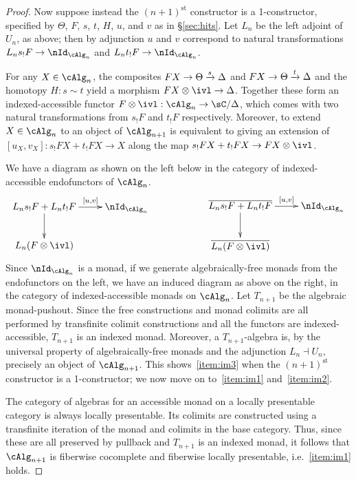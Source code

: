 \documentclass{amsart}
\begin{document}
\begin{proof}
  Now suppose instead the $(n+1)^{\mathrm{st}}$ constructor is a 1-constructor, specified by $\Theta$, $F$, $s$, $t$, $H$, $u$, and $v$ as in \S\ref{sec:hits}.
  Let $L_n$ be the left adjoint of $U_n$, as above; then by adjunction $u$ and $v$ correspond to natural transformations $L_n s_! F \to \nId_{\cAlg_n}$ and $L_n t_! F \to \nId_{\cAlg_n}$.

  For any $X\in\cAlg_n$, the composites $F X \to \Theta \xrightarrow{s} \Delta$ and $F X \to \Theta \xrightarrow{t} \Delta$ and the homotopy $H:s\sim t$ yield a morphism $F X \otimes \ivl \to \Delta$.
  Together these form an indexed-accessible functor $F\otimes \ivl:\cAlg_n \to \sC/\Delta$, which comes with two natural transformations from $s_! F$ and $t_! F$ respectively.
  Moreover, to extend $X\in\cAlg_n$ to an object of $\cAlg_{n+1}$ is equivalent to giving an extension of $[u_X,v_X]:s_!FX + t_! FX \to X$ along the map $s_!FX + t_! FX  \to FX\otimes \ivl$.

  We have a diagram as shown on the left below in the category of indexed-accessible endofunctors of $\cAlg_n$.
  \begin{equation}
  \vcenter{\xymatrix@C=2pc{
      L_n s_! F + L_n t_! F\ar[r]^-{[u,v]}\ar[d] &
      \nId_{\cAlg_n}\\
      L_n (F\otimes \ivl)
    }}
  \hspace{2cm}
\vcenter{\xymatrix@C=2pc{
      \overline{L_n s_! F + L_n t_! F}\ar[r]^-{[u,v]}\ar[d] &
      \nId_{\cAlg_n}\\
      \overline{L_n (F\otimes \ivl)}
      }}
  \end{equation}
  Since $\nId_{\cAlg_n}$ is a monad, if we generate algebraically-free monads from the endofunctors on the left, we have an induced diagram as above on the right, in the category of indexed-accessible monads on $\cAlg_n$.
  Let $T_{n+1}$ be the algebraic monad-pushout.
  Since the free constructions and monad colimits are all performed by transfinite colimit constructions and all the functors are indexed-accessible, $T_{n+1}$ is an indexed monad.
  Moreover, a $T_{n+1}$-algebra is, by the universal property of algebraically-free monads and the adjunction $L_n \dashv U_n$, precisely an object of $\cAlg_{n+1}$.
  This shows~\ref{item:im3} when the $(n+1)^{\mathrm{st}}$ constructor is a 1-constructor; we now move on to~\ref{item:im1} and~\ref{item:im2}.

  The category of algebras for an accessible monad on a locally presentable category is always locally presentable.
  Its colimits are constructed using a transfinite iteration of the monad and colimits in the base category.
  Thus, since these are all preserved by pullback and $T_{n+1}$ is an indexed monad, it follows that $\cAlg_{n+1}$ is fiberwise cocomplete and fiberwise locally presentable, i.e.~\ref{item:im1} holds.


\end{proof}
\end{document}

